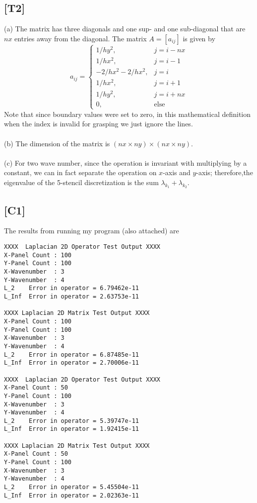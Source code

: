\documentclass[12pt,a4paper]{article}
\renewcommand{\l}{\left}\renewcommand{\r}{\right}
\newcommand{\x}{\times}
\begin{document}
\subsection*{[T2]}
(a) The matrix has three diagonals and one sup- and one sub-diagonal that are $nx$ entries away from the diagonal. The matrix $A = [a_{ij}]$ is given by 
$$a_{ij} = \l\{\begin{array}{ll}
1/hy^2, &j = i-nx\\
1/hx^2, &j = i-1\\
-2/hx^2-2/hx^2, &j=i\\
1/hx^2, &j=i+1\\
1/hy^2, & j = i+nx\\
0, &\text{else}
\end{array}\r.$$
Note that since boundary values were set to zero, in this mathematical definition when the index is invalid for grasping we just ignore the lines. \\
\\
(b) The dimension of the matrix is $(nx \x ny)\x (nx \x ny)$.  \\
\\
(c) For two wave number, since the operation is invariant with multiplying by a constant, we can in fact separate the operation on $x$-axis and $y$-axis; therefore,the eigenvalue of the 5-stencil discretization is the sum $\lambda_{k_1} + \lambda_{k_2}$. 


\subsection*{[C1]}
The results from running my program (also attached) are 
\begin{verbatim}
XXXX  Laplacian 2D Operator Test Output XXXX 
X-Panel Count : 100
Y-Panel Count : 100
X-Wavenumber  : 3
Y-Wavenumber  : 4
L_2    Error in operator = 6.79462e-11
L_Inf  Error in operator = 2.63753e-11

XXXX Laplacian 2D Matrix Test Output XXXX 
X-Panel Count : 100
Y-Panel Count : 100
X-Wavenumber  : 3
Y-Wavenumber  : 4
L_2    Error in operator = 6.87485e-11
L_Inf  Error in operator = 2.70006e-11

XXXX  Laplacian 2D Operator Test Output XXXX 
X-Panel Count : 50
Y-Panel Count : 100
X-Wavenumber  : 3
Y-Wavenumber  : 4
L_2    Error in operator = 5.39747e-11
L_Inf  Error in operator = 1.92415e-11

XXXX Laplacian 2D Matrix Test Output XXXX 
X-Panel Count : 50
Y-Panel Count : 100
X-Wavenumber  : 3
Y-Wavenumber  : 4
L_2    Error in operator = 5.45504e-11
L_Inf  Error in operator = 2.02363e-11
\end{verbatim}
\end{document}
